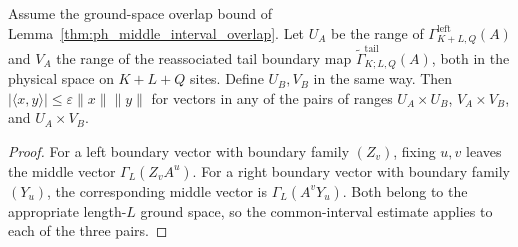 \begin{lemma}
    \label{thm:ph_extended_boundary_overlap}
    \leanok
    Assume the ground-space overlap bound of
    Lemma~\ref{thm:ph_middle_interval_overlap}.
    Let $U_A$ be the range of $\Gamma^{\mathrm{left}}_{K+L,Q}(A)$
    and $V_A$ the range of the reassociated tail boundary map
    $\widetilde\Gamma^{\mathrm{tail}}_{K;L,Q}(A)$,
    both in the physical space on $K+L+Q$ sites. Define $U_B,V_B$ in the same way.
    Then $|\langle x,y\rangle|\leq\varepsilon\lVert x\rVert\lVert y\rVert$
    for vectors in any of the pairs of ranges
    $U_A\times U_B$, $V_A\times V_B$, and $U_A\times V_B$.
\end{lemma}
\begin{proof}
    \leanok
    For a left boundary vector with boundary family $(Z_v)$, fixing $u,v$
    leaves the middle vector $\Gamma_L(Z_vA^u)$.
    For a right boundary vector with boundary family $(Y_u)$, the corresponding
    middle vector is $\Gamma_L(A^vY_u)$.
    Both belong to the appropriate length-$L$ ground space, so the
    common-interval estimate applies to each of the three pairs.
\end{proof}

